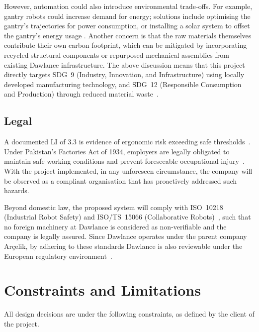 However, automation could also introduce environmental trade-offs. For example, gantry robots could increase demand for energy; solutions include optimising the gantry's trajectories for power consumption, or installing a solar system to offset the gantry's energy usage \cite{vysocky2020}. Another concern is that the raw materials themselves contribute their own carbon footprint, which can be mitigated by incorporating recycled structural components or repurposed mechanical assemblies from existing Dawlance infrastructure. The above discussion means that this project directly targets SDG~9 (Industry, Innovation, and Infrastructure) using locally developed manufacturing technology, and SDG~12 (Responsible Consumption and Production) through reduced material waste~\cite{undp_sdg}.

\subsection{Legal}

A documented LI of 3.3 is evidence of ergonomic risk exceeding safe thresholds~\cite{niosh2024}. Under Pakistan's Factories Act of 1934, employers are legally obligated to maintain safe working conditions and prevent foreseeable occupational injury~\cite{factories_act}. With the project implemented, in any unforeseen circumstance, the company will be observed as a compliant organisation that has proactively addressed such hazards.

Beyond domestic law, the proposed system will comply with ISO~10218 (Industrial Robot Safety) and ISO/TS~15066 (Collaborative Robots)~\cite{iso10218,iso15066}, such that no foreign machinery at Dawlance is considered as non-verifiable and the company is legally assured. Since Dawlance operates under the parent company Arçelik, by adhering to these standards Dawlance is also reviewable under the European regulatory environment~\cite{arcelik}.

\section{Constraints and Limitations}

All design decisions are under the following constraints, as defined by the client of the project.

